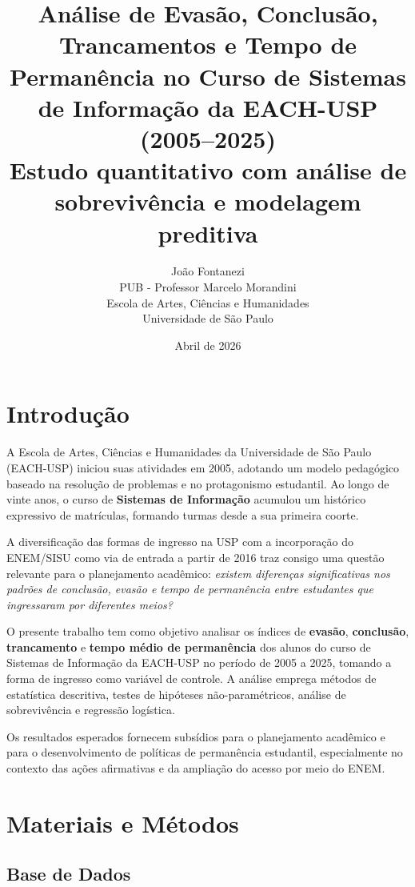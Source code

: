 \documentclass[12pt, a4paper]{article}
\title{%
  \textbf{Análise de Evasão, Conclusão, Trancamentos e Tempo de Permanência
  no Curso de Sistemas de Informação da EACH-USP (2005--2025)}\\[0.5em]
  \large Estudo quantitativo com análise de sobrevivência e modelagem preditiva
}
\author{
  João Fontanezi \\
  PUB - Professor Marcelo Morandini \\
  Escola de Artes, Ciências e Humanidades \\
  Universidade de São Paulo
}
\date{Abril de 2026}
\begin{document}
\maketitle
\newpage
\tableofcontents
\newpage

\section{Introdução}

A Escola de Artes, Ciências e Humanidades da Universidade de São Paulo
(EACH-USP) iniciou suas atividades em 2005, adotando um modelo pedagógico
baseado na resolução de problemas e no protagonismo estudantil. Ao longo de
vinte anos, o curso de \textbf{Sistemas de Informação} acumulou um histórico
expressivo de matrículas, formando turmas desde a sua primeira coorte.

A diversificação das formas de ingresso na USP com a incorporação do
ENEM/SISU como via de entrada a partir de 2016 traz
consigo uma questão relevante para o planejamento acadêmico: \emph{existem
diferenças significativas nos padrões de conclusão, evasão e tempo de
permanência entre estudantes que ingressaram por diferentes meios?}

O presente trabalho tem como objetivo analisar os índices de \textbf{evasão},
\textbf{conclusão}, \textbf{trancamento} e \textbf{tempo médio de permanência}
dos alunos do curso de Sistemas de Informação da EACH-USP no período de 2005 a
2025, tomando a forma de ingresso como variável de controle. A análise emprega
métodos de estatística descritiva, testes de hipóteses não-paramétricos,
análise de sobrevivência e regressão logística.

Os resultados esperados fornecem subsídios para o planejamento acadêmico e
para o desenvolvimento de políticas de permanência estudantil, especialmente
no contexto das ações afirmativas e da ampliação do acesso por meio do ENEM.

\section{Materiais e Métodos}

\subsection{Base de Dados}
\end{document}
